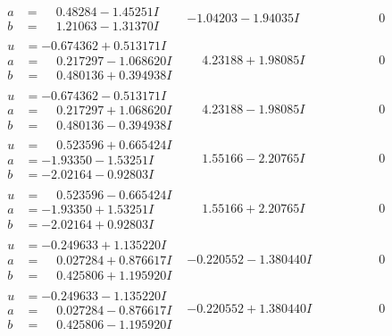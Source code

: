 \documentclass[1p]{elsarticle_modified}
\theoremstyle{definition}
\begin{document}
$$\begin{array}{c|c|c}
\begin{aligned}
a &= \phantom{-}0.48284 - 1.45251 I \\
b &= \phantom{-}1.21063 - 1.31370 I\end{aligned}
 & -1.04203 - 1.94035 I & \phantom{-0.000000 } 0 \\ \hline\begin{aligned}
u &= -0.674362 + 0.513171 I \\
a &= \phantom{-}0.217297 - 1.068620 I \\
b &= \phantom{-}0.480136 + 0.394938 I\end{aligned}
 & \phantom{-}4.23188 + 1.98085 I & \phantom{-0.000000 } 0 \\ \hline\begin{aligned}
u &= -0.674362 - 0.513171 I \\
a &= \phantom{-}0.217297 + 1.068620 I \\
b &= \phantom{-}0.480136 - 0.394938 I\end{aligned}
 & \phantom{-}4.23188 - 1.98085 I & \phantom{-0.000000 } 0 \\ \hline\begin{aligned}
u &= \phantom{-}0.523596 + 0.665424 I \\
a &= -1.93350 - 1.53251 I \\
b &= -2.02164 - 0.92803 I\end{aligned}
 & \phantom{-}1.55166 - 2.20765 I & \phantom{-0.000000 } 0 \\ \hline\begin{aligned}
u &= \phantom{-}0.523596 - 0.665424 I \\
a &= -1.93350 + 1.53251 I \\
b &= -2.02164 + 0.92803 I\end{aligned}
 & \phantom{-}1.55166 + 2.20765 I & \phantom{-0.000000 } 0 \\ \hline\begin{aligned}
u &= -0.249633 + 1.135220 I \\
a &= \phantom{-}0.027284 + 0.876617 I \\
b &= \phantom{-}0.425806 + 1.195920 I\end{aligned}
 & -0.220552 - 1.380440 I & \phantom{-0.000000 } 0 \\ \hline\begin{aligned}
u &= -0.249633 - 1.135220 I \\
a &= \phantom{-}0.027284 - 0.876617 I \\
b &= \phantom{-}0.425806 - 1.195920 I\end{aligned}
 & -0.220552 + 1.380440 I & \phantom{-0.000000 } 0\\

\end{array}$$
\end{document}
